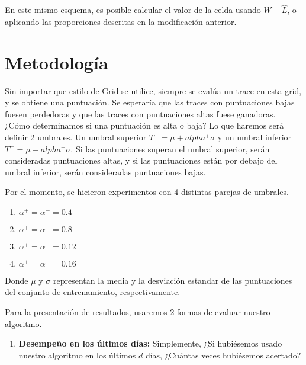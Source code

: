 \documentclass[11pt]{article}
\begin{document}
En este mismo esquema, es posible calcular el valor de la celda usando $\hat W - \hat L$, o aplicando las proporciones descritas en la modificación anterior.

\section{Metodología}
Sin importar que estilo de Grid se utilice, siempre se evalúa un trace en esta grid, y se obtiene una puntuación. Se esperaría que las traces con puntuaciones bajas fuesen perdedoras y que las traces con puntuaciones altas fuese ganadoras. ¿Cómo determinamos si una puntuación es alta o baja? Lo que haremos será definir 2 umbrales. Un umbral superior $T^+ = \mu + alpha^+\sigma$ y un umbral inferior $T^- = \mu - alpha^-\sigma$. Si las puntuaciones superan el umbral superior, serán consideradas puntuaciones altas, y si las puntuaciones están por debajo del umbral inferior, serán consideradas puntuaciones bajas.

Por el momento, se hicieron experimentos con 4 distintas parejas de umbrales.
\begin{enumerate}
    \item $\alpha^+ = \alpha^- = 0.4$
    \item $\alpha^+ = \alpha^- = 0.8$
    \item $\alpha^+ = \alpha^- = 0.12$
    \item $\alpha^+ = \alpha^- = 0.16$
\end{enumerate}
Donde $\mu$ y $\sigma$ representan la media y la desviación estandar de las puntuaciones del conjunto de entrenamiento, respectivamente. 

Para la presentación de resultados, usaremos 2 formas de evaluar nuestro algoritmo. 
\begin{enumerate}
    \item \textbf{Desempeño en los últimos días:} Simplemente, ¿Si hubiésemos usado nuestro algoritmo en los últimos $d$ días, ¿Cuántas veces hubiésemos acertado?
\end{enumerate}

\end{document}

